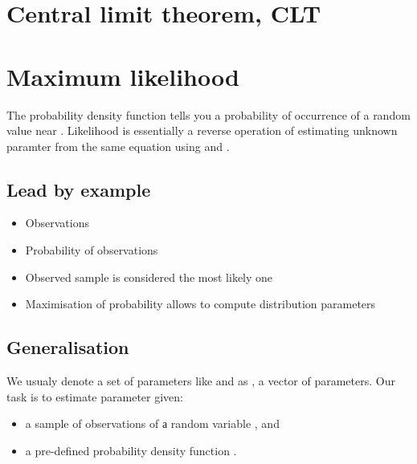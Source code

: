 \documentclass[letterpaper,10pt,english]{sphinxmanual}
\begin{document}
\chapter{Central limit theorem, CLT}
\label{\detokenize{topics/clt:central-limit-theorem-clt}}\label{\detokenize{topics/clt::doc}}



\chapter{Maximum likelihood}
\label{\detokenize{topics/max-likelihood:maximum-likelihood}}\label{\detokenize{topics/max-likelihood::doc}}
The probability density function  tells you a probability of occurrence
of a random value near .  Likelihood is essentially a reverse operation of estimating unknown paramter  from the same equation using  and .


\section{Lead by example}
\label{\detokenize{topics/max-likelihood:lead-by-example}}\begin{itemize}
\item {} 
Observations

\item {} 
Probability of observations

\item {} 
Observed sample is considered the most likely one

\item {} 
Maximisation of probability allows to compute distribution parameters

\end{itemize}


\section{Generalisation}
\label{\detokenize{topics/max-likelihood:generalisation}}
We usualy denote a set of parameters like  and  as , a vector of parameters.
Our task is to estimate parameter  given:
\begin{itemize}
\item {} 
a sample of observations of а random variable , and

\item {} 
a pre-defined probability density function .

\end{itemize}
\end{document}
